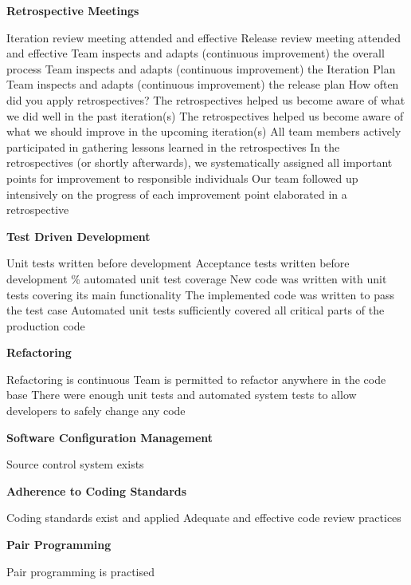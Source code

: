 \begin{appendices}
\textbf{Retrospective Meetings}
\begin{itemize}
	\taa Iteration review meeting attended and effective
	\taa Release review meeting attended and effective
	\taar Team inspects and adapts (continuous improvement) the overall process
	\taar Team inspects and adapts (continuous improvement) the Iteration Plan
	\taar Team inspects and adapts (continuous improvement) the release plan
	\pamr How often did you apply retrospectives? %
	\pamr The retrospectives helped us become aware of what we did well in the past iteration(s)
	\pamr The retrospectives helped us become aware of what we should improve in the upcoming iteration(s)
	\pamr All team members actively participated in gathering lessons learned in the retrospectives
	\pamr In the retrospectives (or shortly afterwards), we systematically assigned all important points for improvement to responsible individuals
	\pamr Our team followed up intensively on the progress of each improvement point elaborated in a retrospective
\end{itemize}

\textbf{Test Driven Development}
\begin{itemize}
	\taa Unit tests written before development
	\taar Acceptance tests written before development
	\% automated unit test coverage
	\pam New code was written with unit tests covering its main functionality
	\pam The implemented code was written to pass the test case
	\pamr Automated unit tests sufficiently covered all critical parts of the production code
\end{itemize}

\textbf{Refactoring}
\begin{itemize}
	\taa Refactoring is continuous
	\pamr Team is permitted to refactor anywhere in the code base
	\pamr There were enough unit tests and automated system tests to allow developers to safely change any code
\end{itemize}

\textbf{Software Configuration Management}
\begin{itemize}
	\taa Source control system exists
\end{itemize}

\textbf{Adherence to Coding Standards}
\begin{itemize}
	\taa Coding standards exist and applied
	\taa Adequate and effective code review practices
\end{itemize}

\textbf{Pair Programming}
\begin{itemize}
	\taa Pair programming is practised
\end{itemize}


\end{appendices}
